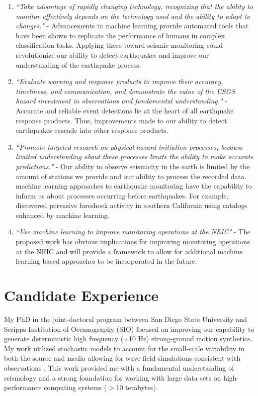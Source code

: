 \documentclass[12p]{article}
\begin{document}
\begin{enumerate}
  \item \emph{``Take advantage of rapidly changing technology, recognizing that the ability to monitor effectively
  depends on the technology used and the ability to adapt to changes."} - Advancements in machine learning provide
  automated tools that have been shown to replicate the performance of humans in complex classification tasks. Applying
  these toward seismic monitoring could revolutionize our ability to detect earthquakes and improve our understanding of the earthquake process.

  \item \emph{``Evaluate warning and response products to improve their accuracy, timeliness, and communication, and
  demonstrate the value of the USGS hazard investment in observations and fundamental understanding."} - Accurate and
  reliable event detections lie at the heart of all earthquake response products. Thus, improvements made to our ability
  to detect earthquakes cascade into other response products.

  \item \emph{``Promote targeted research on physical hazard initiation processes, because limited understanding about
  these processes limits the ability to make accurate predictions."} - Our ability to observe seismicity in the earth is
  limited by the amount of stations we provide and our ability to process the recorded data. machine learning approaches
  to earthquake monitoring have the capability to inform us about processes occurring before earthquakes. For example,
  \citet{Trugman2019} discovered pervasive foreshock activity in southern California using catalogs enhanced by
  machine learning.

  \item \emph{``Use machine learning to improve monitoring operations at the NEIC"} - The proposed work has obvious
  implications for improving monitoring operations at the NEIC and will provide a framework to allow for additional
  machine learning based approaches to be incorporated in the future.
\end{enumerate}

\section{Candidate Experience}

My PhD in the joint-doctoral program between San Diego State University and Scripps Institution of Oceanography (SIO)
focused on improving our capability to generate deterministic high frequency ($\sim$10 Hz) strong-ground motion
synthetics. My work utilized stochastic models to account for the small-scale variability in both the source and media
allowing for wave-field simulations consistent with observations \citep{Savran2016, Savran2017, Savran2019}. This work
provided me with a fundamental understanding of seismology and a strong foundation for working with large data sets on
high-performance computing systems ($>$10 terabytes).
\end{document}
